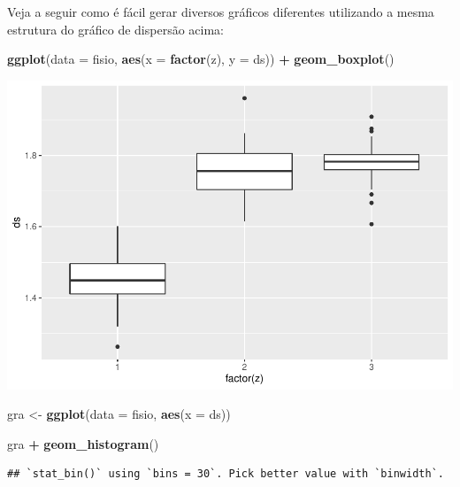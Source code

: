 \documentclass[
]{book}
\newenvironment{Shaded}{\begin{snugshade}}{\end{snugshade}}
\newcommand{\DataTypeTok}[1]{\textcolor[rgb]{0.13,0.29,0.53}{#1}}
\newcommand{\KeywordTok}[1]{\textcolor[rgb]{0.13,0.29,0.53}{\textbf{#1}}}
\newcommand{\NormalTok}[1]{#1}
\newcommand{\OperatorTok}[1]{\textcolor[rgb]{0.81,0.36,0.00}{\textbf{#1}}}
\newcommand{\StringTok}[1]{\textcolor[rgb]{0.31,0.60,0.02}{#1}}
\begin{document}
Veja a seguir como é fácil gerar diversos gráficos diferentes utilizando a mesma estrutura do gráfico de dispersão acima:

\begin{Shaded}
\begin{Highlighting}[]
\KeywordTok{ggplot}\NormalTok{(}\DataTypeTok{data =}\NormalTok{ fisio, }\KeywordTok{aes}\NormalTok{(}\DataTypeTok{x =} \KeywordTok{factor}\NormalTok{(z), }\DataTypeTok{y =}\NormalTok{ ds)) }\OperatorTok{+}
\StringTok{  }\KeywordTok{geom_boxplot}\NormalTok{()}
\end{Highlighting}
\end{Shaded}

\includegraphics{TudodoR_files/figure-latex/unnamed-chunk-190-1.pdf}

\begin{Shaded}
\begin{Highlighting}[]
\NormalTok{gra <-}\StringTok{ }\KeywordTok{ggplot}\NormalTok{(}\DataTypeTok{data =}\NormalTok{ fisio, }\KeywordTok{aes}\NormalTok{(}\DataTypeTok{x =}\NormalTok{ ds)) }
\end{Highlighting}
\end{Shaded}

\begin{Shaded}
\begin{Highlighting}[]
\NormalTok{gra }\OperatorTok{+}\StringTok{  }\KeywordTok{geom_histogram}\NormalTok{()}
\end{Highlighting}
\end{Shaded}

\begin{verbatim}
## `stat_bin()` using `bins = 30`. Pick better value with `binwidth`.
\end{verbatim}
\end{document}
